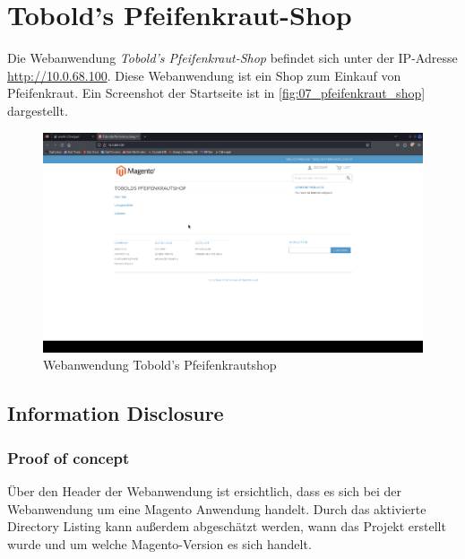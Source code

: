 \chapter{Tobold's Pfeifenkraut-Shop}
Die Webanwendung \textit{Tobold's Pfeifenkraut-Shop} befindet sich unter der IP-Adresse \url{http://10.0.68.100}. Diese Webanwendung ist ein Shop zum Einkauf von Pfeifenkraut. Ein Screenshot der Startseite ist in \autoref{fig:07_pfeifenkraut_shop} dargestellt.

\vfill
\begin{figure}[!ht]
    \centering
    \includegraphics[width=\linewidth]{images/screenshots/09_pfeifenkraut_shop.png}
    \caption{Webanwendung Tobold's Pfeifenkrautshop}
    \label{fig:07_pfeifenkraut_shop}
\end{figure}
\vfill
\newpage



\section{\makecvssbadge Information Disclosure}

\subsection*{Proof of concept}
Über den Header der Webanwendung ist ersichtlich, dass es sich bei der Webanwendung um eine Magento Anwendung handelt. Durch das aktivierte Directory Listing kann außerdem abgeschätzt werden, wann das Projekt erstellt wurde und um welche Magento-Version es sich handelt.

